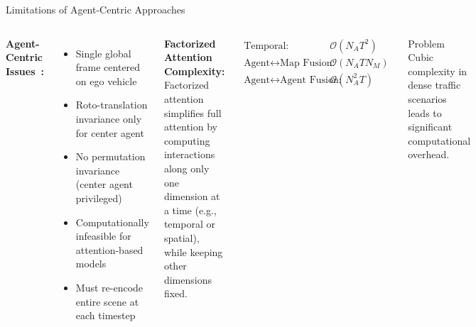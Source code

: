 \documentclass[10pt,aspectratio=169]{beamer}
\begin{document}
\begin{frame}{Limitations of Agent-Centric Approaches}
\begin{columns}[T]
\textbf{Agent-Centric Issues~\cite{qcnetZhou2023}:}
\begin{itemize}
    \item Single global frame centered on ego vehicle
    \item Roto-translation invariance only for center agent
    \item No permutation invariance (center agent privileged)
    \item Computationally infeasible for attention-based models
    \item Must re-encode entire scene at each timestep
\end{itemize}

\textbf{Factorized Attention Complexity:}
Factorized attention simplifies full attention by computing interactions along only one dimension at a time (e.g., temporal or spatial), while keeping other dimensions fixed.

\begin{align}
\text{Temporal:} &\quad \mathcal{O}(N_{A}T^{2}) \\
\text{Agent}\leftrightarrow\text{Map Fusion:} &\quad \mathcal{O}(N_{A}T N_{M}) \\
\text{Agent}\leftrightarrow\text{Agent Fusion:} &\quad \mathcal{O}(N_{A}^{2}T)
\end{align}

\begin{alertblock}{Problem}
Cubic complexity in dense traffic scenarios leads to significant computational overhead.
\end{alertblock}
\end{columns}
\end{frame}
\end{document}
